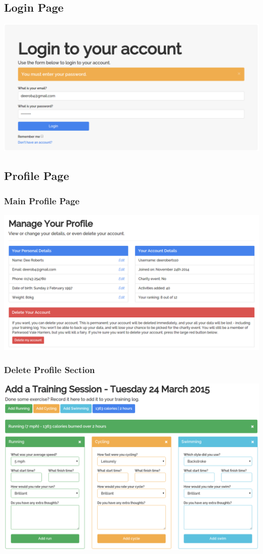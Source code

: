 \documentclass{article}[12pt,a4paper]
\begin{document}
\subsection{Login Page}
\includegraphics[scale=0.35]{final_ui/login}

\subsection{Profile Page}
\subsubsection{Main Profile Page}
\includegraphics[scale=0.35]{final_ui/profile}
\subsubsection{Delete Profile Section}
\includegraphics[scale=0.35]{final_ui/account_delete}
\end{document}
